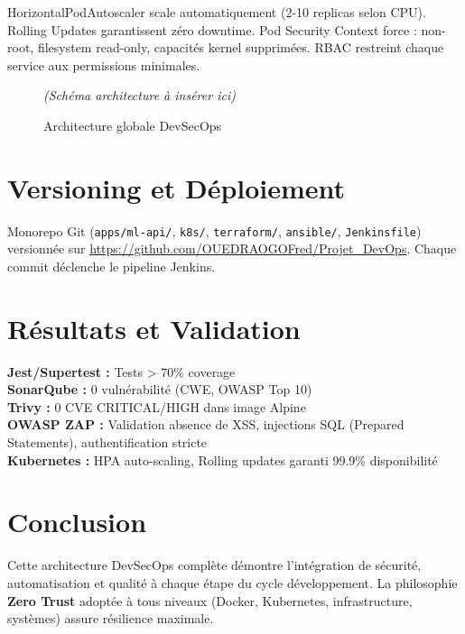 \documentclass[12pt,a4paper]{article}
\begin{document}
HorizontalPodAutoscaler scale automatiquement (2-10 replicas selon CPU). Rolling Updates garantissent zéro downtime. Pod Security Context force : non-root, filesystem read-only, capacités kernel supprimées. RBAC restreint chaque service aux permissions minimales.

\begin{figure}[ht]
    \centering
    \textit{(Schéma architecture à insérer ici)}
    \caption{Architecture globale DevSecOps}
    \label{fig:architecture}
\end{figure}

\clearpage
\section{Versioning et Déploiement}

Monorepo Git (\texttt{apps/ml-api/}, \texttt{k8s/}, \texttt{terraform/}, \texttt{ansible/}, \texttt{Jenkinsfile}) versionnée sur \url{https://github.com/OUEDRAOGOFred/Projet_DevOps}. Chaque commit déclenche le pipeline Jenkins.

\clearpage
\section{Résultats et Validation}

\textbf{Jest/Supertest :} Tests > 70\% coverage \\
\textbf{SonarQube :} 0 vulnérabilité (CWE, OWASP Top 10) \\
\textbf{Trivy :} 0 CVE CRITICAL/HIGH dans image Alpine \\
\textbf{OWASP ZAP :} Validation absence de XSS, injections SQL (Prepared Statements), authentification stricte \\
\textbf{Kubernetes :} HPA auto-scaling, Rolling updates garanti 99.9\% disponibilité

\clearpage
\section{Conclusion}

Cette architecture DevSecOps complète démontre l'intégration de sécurité, automatisation et qualité à chaque étape du cycle développement. La philosophie \textbf{Zero Trust} adoptée à tous niveaux (Docker, Kubernetes, infrastructure, systèmes) assure résilience maximale.
\end{document}
